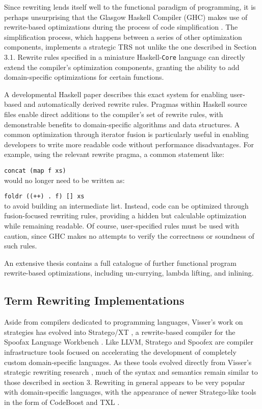 \documentclass{article}
\begin{document}
Since rewriting lends itself well to the functional paradigm of programming, it is perhaps unsurprising that the Glasgow Haskell Compiler (GHC) makes use of rewrite-based optimizations during the process of code simplification \cite{brown2011architecture}.
The simplification process, which happens between a series of other optimization components, implements a strategic TRS not unlike the one described in Section 3.1.
Rewrite rules specified in a miniature Haskell-\texttt{Core} language can directly extend the compiler's optimization components,
granting the ability to add domain-specific optimizations for certain functions.

A developmental Haskell paper \cite{peytonjones2001playing} describes this exact system for enabling user-based and automatically derived rewrite rules. Pragmas within Haskell source files enable direct additions to the compiler's set of rewrite rules, with demonstrable benefits to domain-specific algorithms and data structures. A common optimization through iterator fusion is particularly useful in enabling developers to write more readable code without performance disadvantages. For example, using the relevant rewrite pragma, a common statement like:

\texttt{concat (map f xs)}\\
would no longer need to be written as:

\texttt{foldr ((++) . f) [] xs}\\
to avoid building an intermediate list. Instead, code can be optimized through fusion-focused rewriting rules, providing a hidden but calculable optimization while remaining readable. Of course, user-specified rules must be used with caution, since GHC makes no attempts to verify the correctness or soundness of such rules.

An extensive thesis \cite{paraskevopoulou2020verified} contains a full catalogue of further functional program rewrite-based optimizations, including un-currying, lambda lifting, and inlining.

\subsection{Term Rewriting Implementations}
Aside from compilers dedicated to programming languages, Visser's work on strategies \cite{elco1998building,visser2001Survey,programTransformationWiki,vanwijngaarden2004program} has evolved into Stratego/XT \cite{bravenboer2008Stratego,strategoWebsite}, a rewrite-based compiler for the Spoofax Language Workbench \cite{spoofax}. Like LLVM, Stratego and Spoofex are compiler infrastructure tools focused on accelerating the development of completely custom domain-specific languages. As these tools evolved directly from Visser's strategic rewriting research \cite{elco1998building}, much of the syntax and semantics remain similar to those described in section 3. Rewriting in general appears to be very popular with domain-specific languages, with the appearance of newer Stratego-like tools in the form of CodeBoost \cite{bagge200DSLOpt} and TXL \cite{cordy2006txl}.
\end{document}
